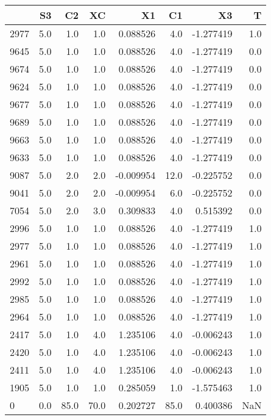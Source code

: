 \begin{tabular}{lrrrrrrr}
\toprule
{} &   S3 &    C2 &    XC &        X1 &    C1 &        X3 &    T \\
\midrule
2977 &  5.0 &   1.0 &   1.0 &  0.088526 &   4.0 & -1.277419 &  1.0 \\
9645 &  5.0 &   1.0 &   1.0 &  0.088526 &   4.0 & -1.277419 &  0.0 \\
9674 &  5.0 &   1.0 &   1.0 &  0.088526 &   4.0 & -1.277419 &  0.0 \\
9624 &  5.0 &   1.0 &   1.0 &  0.088526 &   4.0 & -1.277419 &  0.0 \\
9677 &  5.0 &   1.0 &   1.0 &  0.088526 &   4.0 & -1.277419 &  0.0 \\
9689 &  5.0 &   1.0 &   1.0 &  0.088526 &   4.0 & -1.277419 &  0.0 \\
9663 &  5.0 &   1.0 &   1.0 &  0.088526 &   4.0 & -1.277419 &  0.0 \\
9633 &  5.0 &   1.0 &   1.0 &  0.088526 &   4.0 & -1.277419 &  0.0 \\
9087 &  5.0 &   2.0 &   2.0 & -0.009954 &  12.0 & -0.225752 &  0.0 \\
9041 &  5.0 &   2.0 &   2.0 & -0.009954 &   6.0 & -0.225752 &  0.0 \\
7054 &  5.0 &   2.0 &   3.0 &  0.309833 &   4.0 &  0.515392 &  0.0 \\
2996 &  5.0 &   1.0 &   1.0 &  0.088526 &   4.0 & -1.277419 &  1.0 \\
2977 &  5.0 &   1.0 &   1.0 &  0.088526 &   4.0 & -1.277419 &  1.0 \\
2961 &  5.0 &   1.0 &   1.0 &  0.088526 &   4.0 & -1.277419 &  1.0 \\
2992 &  5.0 &   1.0 &   1.0 &  0.088526 &   4.0 & -1.277419 &  1.0 \\
2985 &  5.0 &   1.0 &   1.0 &  0.088526 &   4.0 & -1.277419 &  1.0 \\
2964 &  5.0 &   1.0 &   1.0 &  0.088526 &   4.0 & -1.277419 &  1.0 \\
2417 &  5.0 &   1.0 &   4.0 &  1.235106 &   4.0 & -0.006243 &  1.0 \\
2420 &  5.0 &   1.0 &   4.0 &  1.235106 &   4.0 & -0.006243 &  1.0 \\
2411 &  5.0 &   1.0 &   4.0 &  1.235106 &   4.0 & -0.006243 &  1.0 \\
1905 &  5.0 &   1.0 &   1.0 &  0.285059 &   1.0 & -1.575463 &  1.0 \\
0    &  0.0 &  85.0 &  70.0 &  0.202727 &  85.0 &  0.400386 &  NaN \\
\bottomrule
\end{tabular}
